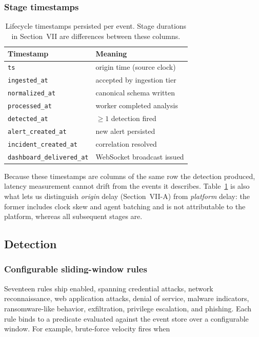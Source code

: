 \documentclass[conference]{IEEEtran}
\begin{document}
\subsubsection{Stage timestamps}

\begin{table}[t]
\caption{Lifecycle timestamps persisted per event. Stage durations in
Section~VII are differences between these columns.}
\label{tab:lifecycle}
\centering
\small
\begin{tabular}{@{}ll@{}}
\toprule
\textbf{Timestamp} & \textbf{Meaning} \\
\midrule
\texttt{ts} & origin time (source clock) \\
\texttt{ingested\_at} & accepted by ingestion tier \\
\texttt{normalized\_at} & canonical schema written \\
\texttt{processed\_at} & worker completed analysis \\
\texttt{detected\_at} & $\geq 1$ detection fired \\
\texttt{alert\_created\_at} & new alert persisted \\
\texttt{incident\_created\_at} & correlation resolved \\
\texttt{dashboard\_delivered\_at} & WebSocket broadcast issued \\
\bottomrule
\end{tabular}
\end{table}

Because these timestamps are columns of the same row the detection produced,
latency measurement cannot drift from the events it describes. Table~\ref{tab:lifecycle}
is also what lets us distinguish \emph{origin} delay (Section~VII-A) from
\emph{platform} delay: the former includes clock skew and agent batching and
is not attributable to the platform, whereas all subsequent stages are.

\subsection{Detection}

\subsubsection{Configurable sliding-window rules}

Seventeen rules ship enabled, spanning credential attacks, network
reconnaissance, web application attacks, denial of service, malware
indicators, ransomware-like behavior, exfiltration, privilege escalation,
and phishing. Each rule binds to a predicate evaluated against the event
store over a configurable window. For example, brute-force velocity fires
when
\end{document}
